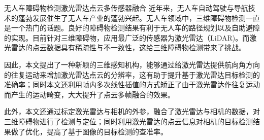 \begin{Cabstract}{无人车}{障碍物检测}{激光雷达}{点云}{多传感器融合}
近年来，无人车自动驾驶与导航技术的蓬勃发展催生了无人车产业的蓬勃兴起。无人车领域中，三维障碍物检测一直是一个热门的话题。良好的障碍物检测结果有利于无人车的路径规划以及自助避障的实现。目前针对三维障碍物，应用最广泛的传感器为激光雷达（LiDAR)。而激光雷达的点云数据具有稀疏性与不一致性，这给三维障碍物检测带来了挑战。

因此，本文提出了一种新颖的三维感知机构，能够通过给激光雷达提供航向角方向的往复运动来增加激光雷达点云的分辨率，这有助于提升基于激光雷达目标检测的准确率；同时本文还利用帧内多次线性插值的方式矫正了由于激光雷达作往复运动而产生的运动畸变，大大提升了点云多帧融合的效果。

此外，本文还通过标定激光雷达与相机的外参，融合了激光雷达与相机的数据，对三维障碍物进行了检测与定位；同时利用激光雷达的点云信息对相机的目标检测结果做了优化，提高了基于图像的目标检测的查准率。
\end{Cabstract}
